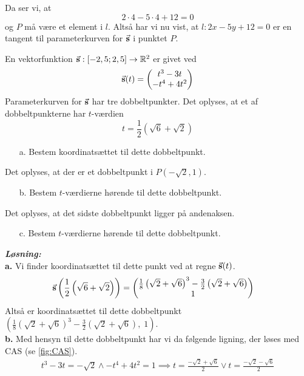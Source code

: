 \documentclass{article}
\newcommand{\sol}{\setlength{\parindent}{0cm}\textbf{\textit{Løsning:}}\setlength{\parindent}{1cm}}
\begin{document}
Da ser vi, at
\[
2 \cdot 4-5 \cdot 4 + 12=0
\] 
og $P$ må være et element i $l$. 
Altså har vi nu vist, at $l:2x-5y+12=0$ er en tangent til parameterkurven for $\va{s} $ i punktet $P$. 
\begin{question}{}{}
  En vektorfunktion $\va{s}:[-2,5;2,5]\to \mathbb{R}^2$ er givet ved 
  \[
  \va{s}(t)=\mqty(t^3-3t\\ -t^4+4t^2) 
  \] 
  Parameterkurven for $\va{s} $ har tre dobbeltpunkter. 
  Det oplyses, at et af dobbeltpunkterne har $t$-værdien 
  \[
  t=\frac{1}{2}\left(\sqrt{6} +\sqrt{2} \right) 
  \] 
  \begin{itemize}
    \item[a.] Bestem koordinatsættet til dette dobbeltpunkt.
  \end{itemize}
  Det oplyses, at der er et dobbeltpunkt i $P(-\sqrt{2},1)$.
  \begin{itemize}
    \item[b.] Bestem $t$-værdierne hørende til dette dobbeltpunkt.
  \end{itemize}
  Det oplyses, at det sidste dobbeltpunkt ligger på andenaksen.
  \begin{itemize}
    \item[c.] Bestem $t$-værdierne hørende til dette dobbeltpunkt.
  \end{itemize}
\end{question}
\sol \\
\textbf{a.}
Vi finder koordinatsættet til dette punkt ved at regne $\va{s}(t)$.
\begin{equation*}
\begin{split}
  \va{s}\left(\frac{1}{2}\left(\sqrt{6} +\sqrt{2} \right)\right)&=\mqty(\frac{1}{8}\left(\sqrt{2} +\sqrt{6} \right)^3-\frac{3}{2}\left(\sqrt{2} +\sqrt{6} \right)\\ 1) 
\end{split}
\end{equation*}
Altså er koordinatsættet til dette dobbeltpunkt $\left(\frac{1}{8}\left(\sqrt{2} +\sqrt{6} \right)^3-\frac{3}{2}\left(\sqrt{2} +\sqrt{6} \right),\;1\right) $. \\[1ex]
\textbf{b.}
Med hensyn til dette dobbeltpunkt har vi da følgende ligning, der løses med CAS (se \cref{fig:CAS}).
\begin{equation*}
\begin{split}
  t^3-3t=-\sqrt{2} \land -t^4+4t^2=1 \implies  t = \frac{-\sqrt{2} + \sqrt{6}}{2}\lor t = \frac{-\sqrt{2} - \sqrt{6}}{2}  
\end{split}
\end{equation*}
\end{document}
